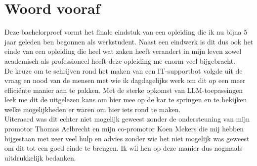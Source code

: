 
\chapter{Woord vooraf}
\label{ch:voorwoord}
Deze bachelorproef vormt het finale eindstuk van een opleiding die ik nu bijna 5 jaar geleden ben begonnen als werkstudent. Naast een eindwerk is dit dus ook het einde van een opleiding die heel wat zaken heeft verandert in mijn leven zowel academisch als professioneel heeft deze opleiding me enorm veel bijgebracht.
\\[1em]
De keuze om te schrijven rond het maken van een IT-supportbot volgde uit de vraag en nood van de mensen met wie ik dagdagelijks werk om dit op een meer efficiënte manier aan te pakken. Met de sterke opkomst van LLM-toepassingen leek me dit de uitgelezen kans om hier mee op de kar te springen en te bekijken welke mogelijkheden er waren om hier iets rond te maken.
\\[1em]
Uiteraard was dit echter niet mogelijk geweest zonder de ondersteuning van mijn promotor Thomas Aelbrecht en mijn co-promotor Koen Mekers die mij hebben bijgestaan met zeer veel hulp en advies zonder wie het niet mogelijk was geweest om dit tot een goed einde te brengen. Ik wil hen op deze manier dus nogmaals uitdrukkelijk bedanken.


